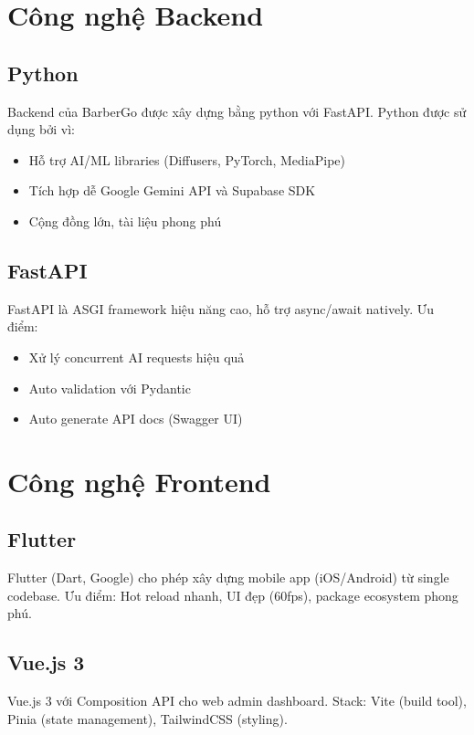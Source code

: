 \section{Công nghệ Backend}

\subsection{Python}

Backend của BarberGo được xây dựng bằng python với FastAPI. Python được sử dụng bởi vì:
\begin{itemize}
    \item Hỗ trợ AI/ML libraries (Diffusers, PyTorch, MediaPipe)
    \item Tích hợp dễ Google Gemini API và Supabase SDK
    \item Cộng đồng lớn, tài liệu phong phú
\end{itemize}

\subsection{FastAPI}

FastAPI là ASGI framework hiệu năng cao, hỗ trợ async/await natively. 
Ưu điểm:
\begin{itemize}
    \item Xử lý concurrent AI requests hiệu quả
    \item Auto validation với Pydantic
    \item Auto generate API docs (Swagger UI)
\end{itemize}

\section{Công nghệ Frontend}
\subsection{Flutter}

Flutter (Dart, Google) cho phép xây dựng mobile app (iOS/Android) từ single codebase. 
Ưu điểm: Hot reload nhanh, UI đẹp (60fps), package ecosystem phong phú.

\subsection{Vue.js 3}

Vue.js 3 với Composition API cho web admin dashboard. 
Stack: Vite (build tool), Pinia (state management), TailwindCSS (styling).

